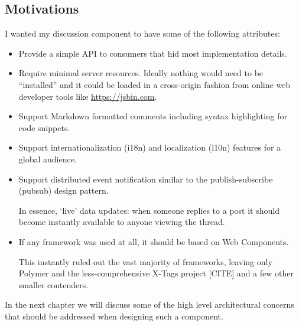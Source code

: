 \subsection{Motivations}

I wanted my discussion component to have some of the following attributes:

\begin{itemize}
\item Provide a simple API to consumers that hid most implementation details.

\item Require minimal server resources. Ideally nothing would need to be ``installed'' and it could be loaded in a cross-origin fashion from online web developer tools like \url{https://jsbin.com}.

\item Support Markdown formatted comments including syntax highlighting for code snippets.

\item Support internationalization (i18n) and localization (l10n) features for a global audience.

\item Support distributed event notification similar to the publish-subscribe (pubsub) design pattern. 

In essence, `live' data updates:
when someone replies to a post it should become instantly available to anyone viewing the thread.

\item If any framework was used at all, it should be based on Web Components. 


This instantly ruled out the vast majority of frameworks, 
leaving only Polymer and the less-comprehensive X-Tags project [CITE] and a few other smaller contenders.

\end{itemize}

In the next chapter we will discuss some of the high level architectural concerns that should be addressed when designing such a component.
